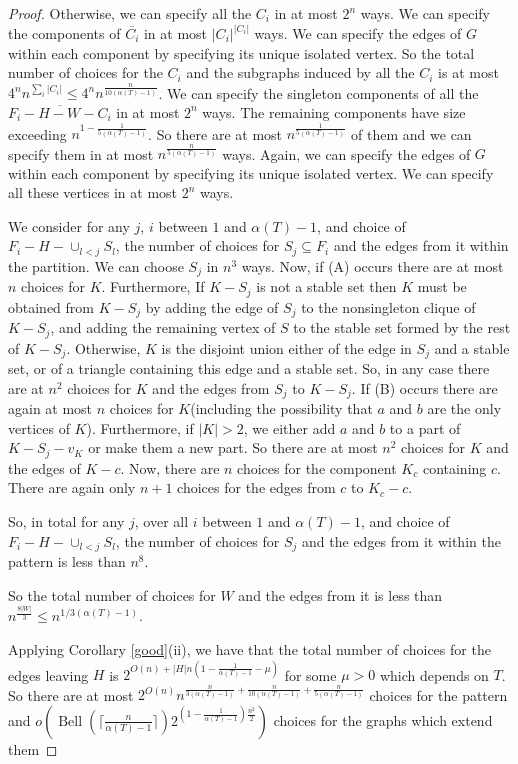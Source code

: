 \documentclass[12pt]{article}
\theoremstyle{definition}
\DeclareMathOperator{\Bell}{Bell}
\begin{document}
\begin{proof}
Otherwise, we can specify  all the $C_i$    in at most  $2^n$ ways.
We can specify the components of   $\overline{C_i}$ in at most $|C_i|^{|C_i|}$ ways. We can specify the edges of $G$ within each component by specifying 
its unique isolated vertex. So the total number of choices for  the $C_i$ and the subgraphs induced by all the $C_i$ is at most $4^nn^{\sum_i |C_i|} \le 4^nn^{\frac{n}{10(\alpha(T)-1)}}$.
We can specify the singleton components of all the $\overline{F_i-H-W-C_i}$ in at most $2^n$ ways. The remaining components have size exceeding $n^{1-\frac{1}{5(\alpha(T)-1)}}$.
So there are at most $n^{\frac{1}{5(\alpha(T)-1)}}$  of them  and  we can specify them in at most $n^{\frac{n}{5(\alpha(T)-1)}}$ ways.  Again, we can specify the edges of $G$ within each component by specifying its unique isolated vertex. We can specify all these vertices in at most $2^n$ ways. 

 We consider   for any $j$,  $i$ between $1$ and $\alpha(T)-1$, and choice of $F_i-H-\cup_{l<j} S_l$, the number of choices for $S_j \subseteq F_i$ and the edges from it within the partition.
 We can choose $S_j$ in $n^3$ ways. Now, if (A) occurs there are at most $n$ choices for $K$. Furthermore, If $K-S_j$ is not a stable set then $K$ must be obtained from $K-S_j$ 
 by adding the edge of $S_j$ to the nonsingleton clique of $K-S_j$, and adding the remaining vertex of $S$  to the stable set formed  by the rest of $K-S_j$. Otherwise, $K$ is the disjoint union  either of 
 the edge in $S_j$ and a stable set, or of  a triangle containing this edge and a stable set. So, in any case there are at $n^2$ choices for $K$ and  the edges from $S_j$ to  $K-S_j$. If (B) occurs there are again
  at most $n$ choices for $K$(including the possibility that $a$ and $b$ are the only vertices of $K$). Furthermore, if $|K|>2$,  we either add $a$ and $b$ to a part of  $K-S_j-v_K$  or make them a new part. So there are at most $n^2$ choices for $K$ and the edges of
  $K-c$. Now, there are $n$ choices for the component $K_c$ containing $c$. There are again only $n+1$ choices for the edges from $c$ to  $K_c-c$. 
  
 So, in total  for any $j$,  over all $i$ between $1$ and $\alpha(T)-1$, and choice of $F_i-H-\cup_{l<j} S_l$, the number of choices for $S_j$ and the edges from it within the pattern
 is  less than $n^8$. 
 
 So the total number of choices for $W$ and the edges from it is less than $n^{\frac{8|W|}{3}} \le n^{1/3(\alpha(T)-1)}$. 
 
Applying Corollary \ref{good}(ii),  we have that 
the total number of choices for the edges leaving $H$ is $2^{O(n)+|H|n(1-\frac{1}{\alpha(T)-1}-\mu)}$ for some $\mu>0$ which depends on $T$. 
So there are  at most $2^{O(n)}n^{\frac{n}{3(\alpha(T)-1)}+ \frac{n}{10(\alpha(T)-1)} + \frac{n}{5(\alpha(T)-1)}} $  choices for the pattern
and $o(\Bell( \lceil \frac{n}{\alpha(T)-1} \rceil) 2^{(1-\frac{1}{\alpha(T)-1})\frac{n^2}{2}}) $ choices for the graphs which extend them 
  \end{proof}
\end{document}
